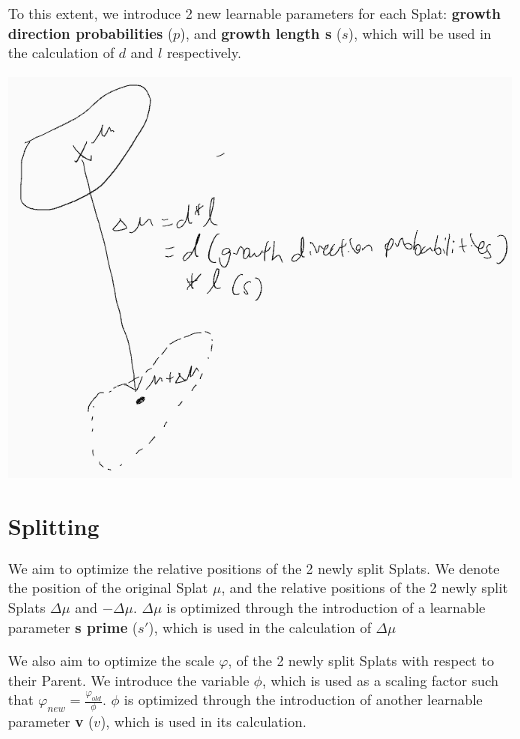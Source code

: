 \documentclass[11pt]{report}
\begin{document}
To this extent, we introduce 2 new learnable parameters for each Splat: \textbf{growth direction probabilities} ($p$), and \textbf{growth length s} ($s$), which will be used in the calculation of $d$ and $l$ respectively.

\begin{center}
\begin{minipage}{0.4\linewidth}
\includegraphics[width = \linewidth]{assets/clone}
\end{minipage}
\end{center}

\subsection{Splitting}
We aim to optimize the relative positions of the 2 newly split Splats. We denote the position of the original Splat $\mu$, and the relative positions of the 2 newly split Splats $\Delta \mu$ and $- \Delta \mu$. $\Delta \mu$ is optimized through the introduction of a learnable parameter \textbf{s prime} ($s'$), which is used in the calculation of $\Delta \mu$

We also aim to optimize the scale $\varphi$, of the 2 newly split Splats with respect to their Parent. We introduce the variable $\phi$, which is used as a scaling factor such that $\varphi_{new} = \frac{\varphi_{old}}{\phi}$. $\phi$ is optimized through the introduction of another learnable parameter \textbf{v} ($v$), which is used in its calculation.
\end{document}
